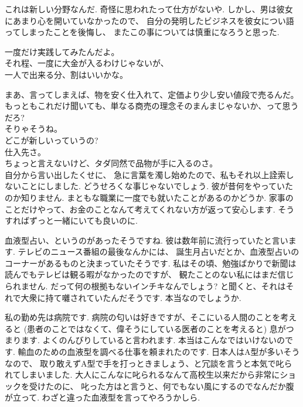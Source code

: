 これは新しい分野なんだ.
奇怪に思われたって仕方がないや.
しかし、男は彼女にあまり心を開いていなかったので、
自分の発明したビジネスを彼女につい語ってしまったことを後悔し、
またこの事については慎重になろうと思った.

一度だけ実践してみたんだよ。\\
それ程、一度に大金が入るわけじゃないが、\\
一人で出来る分、割はいいかな。

まあ、言ってしまえば、物を安く仕入れて、定価より少し安い値段で売るんだ。\\
もっともこれだけ聞いても、単なる商売の理念そのまんまじゃないか、って思うだろ?\\
そりゃそうね。\\
どこが新しいっていうの?\\
仕入先さ。\\
ちょっと言えないけど、タダ同然で品物が手に入るのさ。\\

自分から言い出したくせに、
急に言葉を濁し始めたので、私もそれ以上詮索しないことにしました.
どうせろくな事じゃないでしょう.
彼が昔何をやっていたのか知りません.
まともな職業に一度でも就いたことがあるのかどうか.
家事のことだけやって、お金のことなんて考えてくれない方が返って安心します.
そうすればずっと一緒にいても良いのに.

血液型占い、というのがあったそうですね.
彼は数年前に流行っていたと言います.
テレビのニュース番組の最後なんかには、
誕生月占いだとか、血液型占いのコーナーがあるものと決まっていたそうです.
私はその頃、勉強ばかりで新聞は読んでもテレビは観る暇がなかったのですが、
観たことのない私にはまだ信じられません.
だって何の根拠もないインチキなんでしょう?
と聞くと、それはそれで大衆に持て囃されていたんだそうです.
本当なのでしょうか.

私の勤め先は病院です.
病院の匂いは好きですが、そこにいる人間のことを考えると
(患者のことではなくて、偉そうにしている医者のことを考えると)
息がつまります.
よくのんびりしていると言われます.
本当はこんなではいけないのです.
輸血のための血液型を調べる仕事を頼まれたのです.
日本人はA型が多いそうなので、
取り敢えずA型で手を打っときましょう、と冗談を言うと本気で叱られてしまいました.
大人にこんなに叱られるなんて高校生以来だから非常にショックを受けたのに、
叱った方はと言うと、何でもない風にするのでなんだか腹が立って.
わざと違った血液型を言ってやろうかしら.

